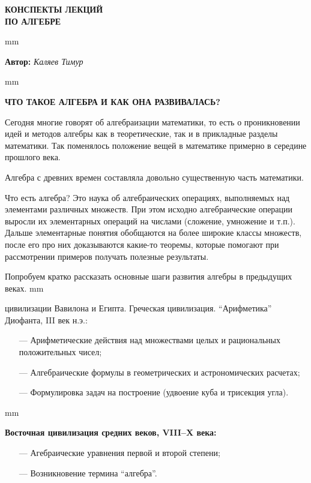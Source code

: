 \documentclass[12pt,english,russian]{article}
\begin{document}
		\begin{center}
			{\Huge {\bf КОНСПЕКТЫ ЛЕКЦИЙ\\ ПО АЛГЕБРЕ}  }
		\end{center}
	 mm
		\begin{center}
			{\large {\bf Автор:} \textit{Каляев Тимур}}
		\end{center}
		
	 mm
		\begin{center}
			{\large {\bf ЧТО ТАКОЕ АЛГЕБРА И КАК ОНА РАЗВИВАЛАСЬ?}}
		\end{center}
	
	
	Сегодня многие говорят об алгебраизации математики, то есть
	о проникновении идей и методов алгебры как в теоретические,
	так и в прикладные разделы математики. Так поменялось положение 
	вещей в математике примерно в середине прошлого века.
	
	Алгебра с древних времен составляла довольно существенную
	часть математики.
	
	Что есть алгебра? Это наука об алгебраических операциях, выполняемых 
	над элементами различных множеств. При этом исходно 
	алгебраические операции выросли их элементарных операций 
	на числами (сложение, умножение и т.п.). Дальше элементарные 
	понятия обобщаются на более широкие классы множеств,
	после его про них доказываются какие-то теоремы, которые помогают 
	при рассмотрении примеров получать полезные результаты.
	
	Попробуем кратко рассказать основные шаги развития алгебры 
	в предыдущих веках.
	 mm
	
	{ цивилизации Вавилона и Египта. Греческая цивилизация. 
	“Арифметика” Диофанта, III век н.э.:}
	\begin{enumerate}
	\item[---] Арифметические действия над множествами целых и рациональных 
	положительных чисел;
	\item[---] Алгебраические формулы в геометрических и астрономических расчетах;
	\item[---] Формулировка задач на построение (удвоение куба и трисекция угла).
	\end{enumerate}
	
	 mm
	
	{\bf Восточная цивилизация средних веков, VIII–X века:}
	\begin{enumerate}
	\item[---] Агебраические уравнения первой и второй степени;
	\item[---] Возникновение термина “алгебра”.
	\end{enumerate}
	
\end{document}
